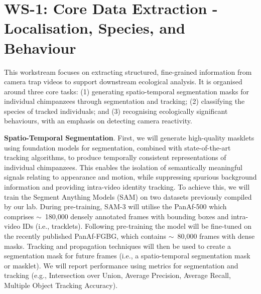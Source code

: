 
\section*{WS-1: Core Data Extraction - Localisation, Species, and Behaviour}

This workstream focuses on extracting structured, fine-grained information from camera trap videos to support downstream ecological analysis. It is organised around three core tasks: (1) generating spatio-temporal segmentation masks for individual chimpanzees through segmentation and tracking; (2) classifying the species of tracked individuals; and (3) recognising ecologically significant behaviours, with an emphasis on detecting camera reactivity.

\textbf{Spatio-Temporal Segmentation}. First, we will generate high-quality masklets using foundation models for segmentation, combined with state-of-the-art tracking algorithms, to produce temporally consistent representations of individual chimpanzees. This enables the isolation of semantically meaningful signals relating to appearance and motion, while suppressing spurious background information and providing intra-video identity tracking. To achieve this, we will train the Segment Anything Models (SAM) on two datasets previously compiled by our lab. During pre-training, SAM-3 will utilise the PanAf-500 which comprises $\sim$~180,000 densely annotated frames with bounding boxes and intra-video IDs (i.e., tracklets). Following pre-training the model will be fine-tuned on the recently published PanAf-FGBG, which contains $\sim$~80,000 frames with dense masks. Tracking and propagation techniques will then be used to create a segmentation mask for future frames (i.e., a spatio-temporal segmentation mask or masklet). We will report performance using metrics for segmentation and tracking (e.g., Intersection over Union, Average Precision, Average Recall, Multiple Object Tracking Accuracy).


